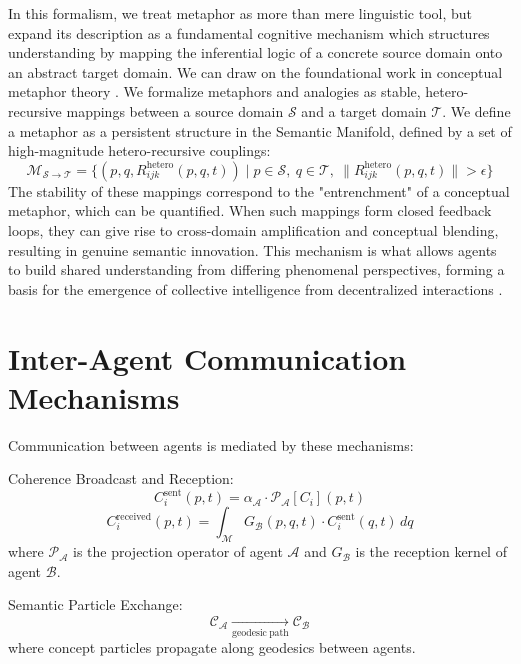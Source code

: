 In this formalism, we treat metaphor as more than mere linguistic tool, but expand its description as a fundamental cognitive mechanism which structures understanding by mapping the inferential logic of a concrete source domain onto an abstract target domain. We can draw on the foundational work in conceptual metaphor theory \autocite{LakoffJohnson1980, HofstadterSander2013}. We formalize metaphors and analogies as stable, hetero-recursive mappings between a source domain \(\mathcal{S}\) and a target domain \(\mathcal{T}\). We define a metaphor as a persistent structure in the Semantic Manifold, defined by a set of high-magnitude hetero-recursive couplings:
\begin{equation}
\mathcal{M}_{\mathcal{S} \to \mathcal{T}} = \{(p, q, R_{ijk}^{\text{hetero}}(p, q, t)) \mid p \in \mathcal{S},\ q \in \mathcal{T},\ \|R_{ijk}^{\text{hetero}}(p, q, t)\| > \epsilon\}
\end{equation}
The stability of these mappings correspond to the "entrenchment" of a conceptual metaphor, which can be quantified. When such mappings form closed feedback loops, they can give rise to cross-domain amplification and conceptual blending, resulting in genuine semantic innovation. This mechanism is what allows agents to build shared understanding from differing phenomenal perspectives, forming a basis for the emergence of collective intelligence from decentralized interactions \autocite{Surowiecki2004}.

\section{Inter-Agent Communication Mechanisms}

Communication between agents is mediated by these mechanisms:

Coherence Broadcast and Reception:
\begin{equation}
C_i^{\mathrm{sent}}(p,t) = \alpha_{\mathcal{A}} \cdot \mathcal{P}_{\mathcal{A}}[C_i](p,t)
\end{equation}
\begin{equation}
C_i^{\mathrm{received}}(p,t) = \int_{\mathcal{M}} G_{\mathcal{B}}(p,q,t) \cdot C_i^{\mathrm{sent}}(q,t) \, dq
\end{equation}
where \(\mathcal{P}_{\mathcal{A}}\) is the projection operator of agent \(\mathcal{A}\) and \(G_{\mathcal{B}}\) is the reception kernel of agent \(\mathcal{B}\).

Semantic Particle Exchange:
\begin{equation}
\mathcal{C}_{\mathcal{A}} \xrightarrow[\mathrm{geodesic\ path}]{} \mathcal{C}_{\mathcal{B}}
\end{equation}
where concept particles propagate along geodesics between agents.

